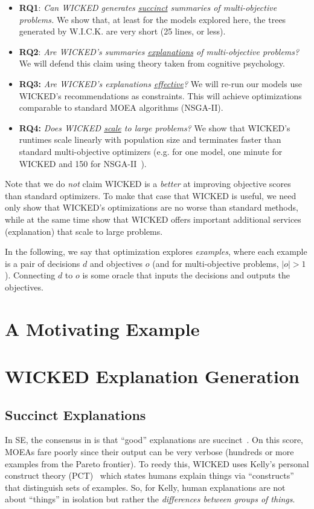 \documentclass[runningheads]{llncs}
\newcommand{\bi}{\begin{itemize}}
\newcommand{\ei}{\end{itemize}}
\begin{document}
\bi
\item[{\bf RQ1}:] {\em Can WICKED generates \underline{succinct} summaries of multi-objective problems.} 
We show that, at least for the models explored here, the trees
generated by W.I.C.K. are very short (25 lines, or less).
\item[{\bf RQ2}:] {\em Are WICKED's summaries \underline{explanations} of multi-objective problems?}
We will defend this claim using theory taken from cognitive psychology.
\item[{\bf RQ3:}] {\em Are WICKED's  explanations \underline{effective}?}
We will re-run our models use WICKED's 
recommendations as constraints. This will  achieve optimizations comparable
to standard MOEA algorithms (NSGA-II).
\item [{\bf RQ4:}] {\em Does WICKED \underline{scale} to large problems?}
 We show that WICKED's
runtimes scale linearly with population size and terminates
faster than standard multi-objective optimizers
 (e.g. for one model, one minute for WICKED and 150 for NSGA-II~\cite{deb00a}).
\ei
Note that we do {\em not} claim WICKED is a
{\em better} at improving objective
scores than standard optimizers.  To make that case that WICKED is useful,
we need only show that WICKED's optimizations are no worse than standard methods,
while at the same time show that WICKED offers important additional services (explanation)
that scale to large problems.


In the following, we say that optimization explores {\em examples},
where each example is a pair of decisions $d$ and objectives $o$ (and for multi-objective problems,
$|o|>1$). Connecting $d$ to $o$ is some oracle that inputs the decisions and outputs the objectives.

\section{A Motivating Example}




\section{WICKED  Explanation Generation}
\subsection{Succinct Explanations}
In SE,
the  consensus in
is that ``good'' explanations
are succinct~\cite{ag98,dej13z,fenton99}.
On this score, MOEAs fare poorly since their output can be very verbose
(hundreds or more examples from the Pareto frontier).
To reedy this,
WICKED uses Kelly's personal
construct theory (PCT)~\cite{kelly55} which states humans explain things via
``constructs'' that distinguish sets of examples.
So, for Kelly, human explanations are not about
``things'' in isolation but rather the {\em
differences between groups of things}. 
\end{document}
